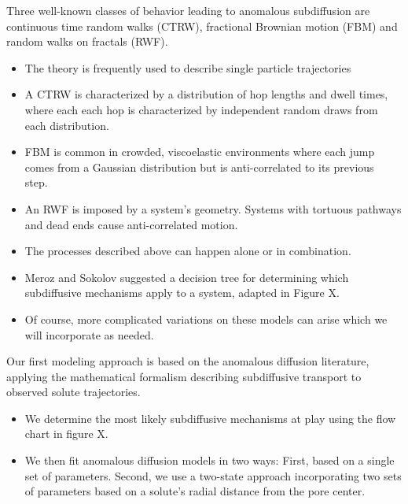 \documentclass{article}
\begin{document}
  \noindent Three well-known classes of behavior leading to anomalous subdiffusion are 
  continuous time random walks (CTRW), fractional Brownian motion
  (FBM) and random walks on fractals (RWF).\cite{meroz_toolbox_2015}
  \begin{itemize}
    \item The theory is frequently used to describe single particle trajectories
    \item A CTRW is characterized by a distribution of hop lengths and 
    dwell times, where each each hop is characterized by independent random draws from 
    each distribution.\cite{montroll_random_1965,morrin_three_2018}
    \item FBM is common in crowded, viscoelastic environments where each jump comes 
    from a Gaussian distribution but is anti-correlated to its previous 
    step.~\cite{mandelbrot_fractional_1968,jeon_fractional_2010,banks_anomalous_2005}
    \item An RWF is imposed by a system's geometry. Systems with tortuous pathways and dead
    ends cause anti-correlated motion.\cite{meroz_toolbox_2015,neusius_subdiffusion_2008}
    \item The processes described above can happen alone or in combination. 
    \item Meroz and Sokolov suggested a decision tree for determining which subdiffusive
    mechanisms apply to a system, adapted in Figure X. 
    \item Of course, more complicated variations on these models can arise which we 
    will incorporate as needed.	  %
  \end{itemize}
  
  
  Our first modeling approach is based on the anomalous diffusion literature, applying the 
  mathematical formalism describing subdiffusive transport to observed solute 
  trajectories.
  \begin{itemize}
    \item We determine the most likely subdiffusive mechanisms at play using the 
    flow chart in figure X. 
    \item We then fit anomalous diffusion models in two ways: First, based on a
    single set of parameters. Second, we use a two-state approach incorporating
    two sets of parameters based on a solute's radial distance from the pore center. 
  \end{itemize}
  
\end{document}
